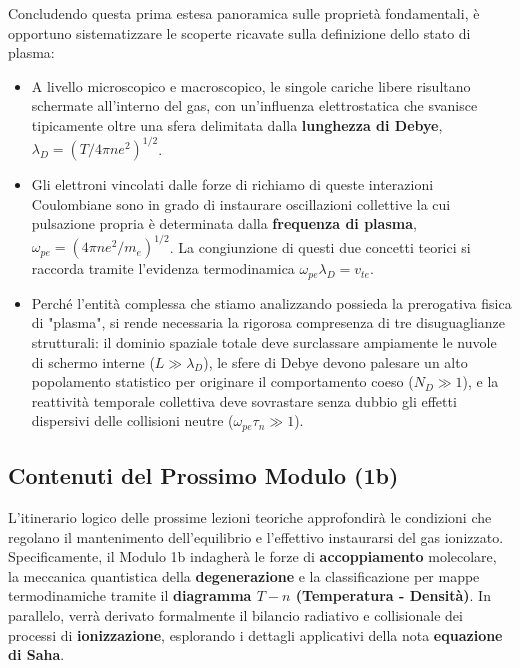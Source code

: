 Concludendo questa prima estesa panoramica sulle proprietà fondamentali, è opportuno sistematizzare le scoperte ricavate sulla definizione dello stato di plasma:
\begin{itemize}
\item A livello microscopico e macroscopico, le singole cariche libere risultano schermate all'interno del gas, con un'influenza elettrostatica che svanisce tipicamente oltre una sfera delimitata dalla \textbf{lunghezza di Debye}, $\lambda_D = (T/4\pi n e^2)^{1/2}$.
\item Gli elettroni vincolati dalle forze di richiamo di queste interazioni Coulombiane sono in grado di instaurare oscillazioni collettive la cui pulsazione propria è determinata dalla \textbf{frequenza di plasma}, $\omega_{pe} = (4\pi n e^2/m_e)^{1/2}$. La congiunzione di questi due concetti teorici si raccorda tramite l'evidenza termodinamica $\omega_{pe} \lambda_D = v_{te}$.
\item Perché l'entità complessa che stiamo analizzando possieda la prerogativa fisica di "plasma", si rende necessaria la rigorosa compresenza di tre disuguaglianze strutturali: il dominio spaziale totale deve surclassare ampiamente le nuvole di schermo interne ($L \gg \lambda_D$), le sfere di Debye devono palesare un alto popolamento statistico per originare il comportamento coeso ($N_D \gg 1$), e la reattività temporale collettiva deve sovrastare senza dubbio gli effetti dispersivi delle collisioni neutre ($\omega_{pe}\tau_n \gg 1$).
\end{itemize}

\subsection{Contenuti del Prossimo Modulo (1b)}
L'itinerario logico delle prossime lezioni teoriche approfondirà le condizioni che regolano il mantenimento dell'equilibrio e l'effettivo instaurarsi del gas ionizzato. Specificamente, il Modulo 1b indagherà le forze di \textbf{accoppiamento} molecolare, la meccanica quantistica della \textbf{degenerazione} e la classificazione per mappe termodinamiche tramite il \textbf{diagramma $T-n$ (Temperatura - Densità)}. In parallelo, verrà derivato formalmente il bilancio radiativo e collisionale dei processi di \textbf{ionizzazione}, esplorando i dettagli applicativi della nota \textbf{equazione di Saha}.